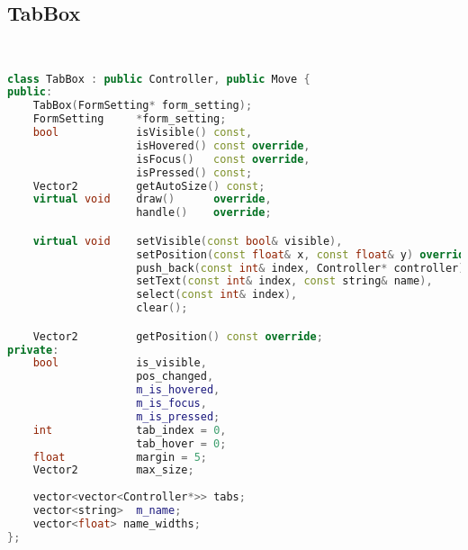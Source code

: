 \subsection{TabBox}
\begin{lstlisting}[language=C++]


class TabBox : public Controller, public Move {
public:
    TabBox(FormSetting* form_setting);
    FormSetting     *form_setting;
    bool            isVisible() const,
                    isHovered() const override,
                    isFocus()   const override,
                    isPressed() const;
    Vector2         getAutoSize() const;
    virtual void    draw()      override,
                    handle()    override;

    virtual void    setVisible(const bool& visible),
                    setPosition(const float& x, const float& y) override,
                    push_back(const int& index, Controller* controller),
                    setText(const int& index, const string& name),
                    select(const int& index),
                    clear();

    Vector2         getPosition() const override;
private:
    bool            is_visible,
                    pos_changed,
                    m_is_hovered,
                    m_is_focus,
                    m_is_pressed;
    int             tab_index = 0,
                    tab_hover = 0;
    float           margin = 5;
    Vector2         max_size;
    
    vector<vector<Controller*>> tabs;
    vector<string>  m_name;
    vector<float> name_widths;
};





\end{lstlisting}
